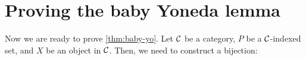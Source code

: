 \section{Proving the baby Yoneda lemma}
Now we are ready to prove \cref{thm:baby-yo}. Let $\mathcal C$ be a 
category, $P$ be a $\mathcal C$-indexed set, and $X$ be an object 
in $\mathcal C$. Then, we need to construct a bijection:

\begin{center}
\end{center}

